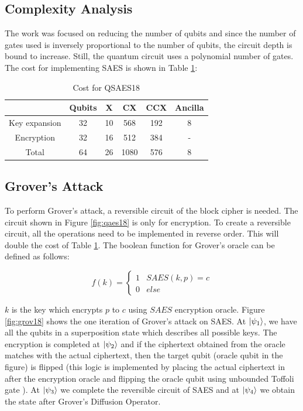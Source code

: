 \documentclass[preprint]{transcrypto}
\begin{document}
\subsection{Complexity Analysis}
The work was focused on reducing the number of qubits and since the number of gates used is inversely proportional to the number of qubits, the circuit depth is bound to increase. Still, the quantum circuit uses a polynomial number of gates. The cost for implementing SAES is shown in Table \ref{tab:cost}:
\begin{center}
\begin{table}[h!]
    \centering
    \begin{tabular}{ |c|c|c|c|c|c| } 
     \hline
       & Qubits & X & CX & CCX & Ancilla \\ \hline
     Key expansion & 32 & 10& 568 & 192 & 8 \\ \hline
     Encryption & 32 & 16 & 512 & 384 & - \\ \hline
     Total & 64 & 26 & 1080 & 576 & 8 \\ \hline
    \end{tabular}
    \caption{Cost for QSAES18 \cite{Almazrooie}}
    \label{tab:cost}
\end{table}
\end{center}

\subsection{Grover's Attack}
To perform Grover's attack, a reversible circuit of the block cipher is needed. The circuit shown in Figure \ref{fig:qaes18} is only for encryption. To create a reversible circuit, all the operations need to be implemented in reverse order. This will double the cost of Table \ref{tab:cost}. The boolean function for Grover's oracle can be defined as follows:

\begin{equation*}
 f(k) = 
 \begin{cases} 
      1 & SAES(k, p) = c\\
      0 & else 
  \end{cases}
\end{equation*}

$k$ is the key which encrypts $p$ to $c$ using $SAES$ encryption oracle. Figure \ref{fig:grov18} shows the one iteration of Grover's attack on SAES. At $\ket{\psi_1}$, we have all the qubits in a superposition state which describes all possible keys. The encryption is completed at $\ket{\psi_2}$ and if the ciphertext obtained from the oracle matches with the actual ciphertext, then the target qubit (oracle qubit in the figure) is flipped (this logic is implemented by placing the actual ciphertext in after the encryption oracle and flipping the oracle qubit using unbounded Toffoli gate \cite{mcmt}). At $\ket{\psi_3}$ we complete the reversible circuit of SAES and at $\ket{\psi_4}$ we obtain the state after Grover's Diffusion Operator.
\end{document}
